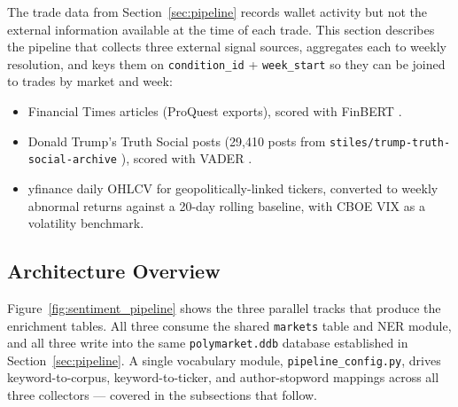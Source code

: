 \documentclass[11pt,a4paper]{article}
\begin{document}
The trade data from Section~\ref{sec:pipeline} records wallet
activity but not the external information available at the time of
each trade. This section describes the pipeline that collects three
external signal sources, aggregates each to weekly resolution, and
keys them on \texttt{condition\_id} + \texttt{week\_start} so they
can be joined to trades by market and week:



\begin{itemize}
    \item Financial Times articles (ProQuest exports), scored with
          FinBERT \cite{araci2019finbert}.
    \item Donald Trump's Truth Social posts (29,410 posts from
          \texttt{stiles/trump-truth-social-archive}
          \cite{trump_archive}), scored with VADER
          \cite{hutto2014vader}.
    \item yfinance daily OHLCV for geopolitically-linked tickers,
          converted to weekly abnormal returns against a 20-day
          rolling baseline, with CBOE VIX as a volatility benchmark.
\end{itemize}



\subsection{Architecture Overview}
\label{sec:sentiment_architecture}

Figure~\ref{fig:sentiment_pipeline} shows the three parallel tracks
that produce the enrichment tables. All three consume the shared
\texttt{markets} table and NER module, and all three write into the
same \texttt{polymarket.ddb} database established in
Section~\ref{sec:pipeline}. A single vocabulary module,
\texttt{pipeline\_config.py}, drives keyword-to-corpus, keyword-to-ticker,
and author-stopword mappings across all three collectors — covered
in the subsections that follow.
\end{document}
